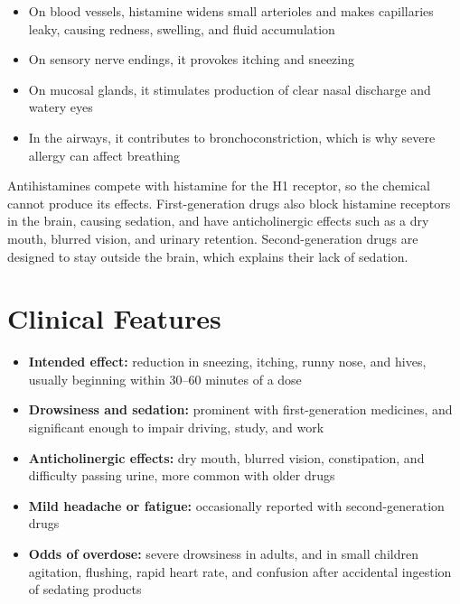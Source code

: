 \begin{itemize}
    \item On blood vessels, histamine widens small arterioles and makes capillaries leaky, causing redness, swelling, and fluid accumulation
    \item On sensory nerve endings, it provokes itching and sneezing
    \item On mucosal glands, it stimulates production of clear nasal discharge and watery eyes
    \item In the airways, it contributes to bronchoconstriction, which is why severe allergy can affect breathing
\end{itemize}

Antihistamines compete with histamine for the H1 receptor, so the chemical cannot produce its effects. First-generation drugs also block histamine receptors in the brain, causing sedation, and have anticholinergic effects such as a dry mouth, blurred vision, and urinary retention. Second-generation drugs are designed to stay outside the brain, which explains their lack of sedation.

\section*{Clinical Features}
\begin{itemize}
    \item \textbf{Intended effect:} reduction in sneezing, itching, runny nose, and hives, usually beginning within 30--60 minutes of a dose
    \item \textbf{Drowsiness and sedation:} prominent with first-generation medicines, and significant enough to impair driving, study, and work
    \item \textbf{Anticholinergic effects:} dry mouth, blurred vision, constipation, and difficulty passing urine, more common with older drugs
    \item \textbf{Mild headache or fatigue:} occasionally reported with second-generation drugs
    \item \textbf{Odds of overdose:} severe drowsiness in adults, and in small children agitation, flushing, rapid heart rate, and confusion after accidental ingestion of sedating products
\end{itemize}

